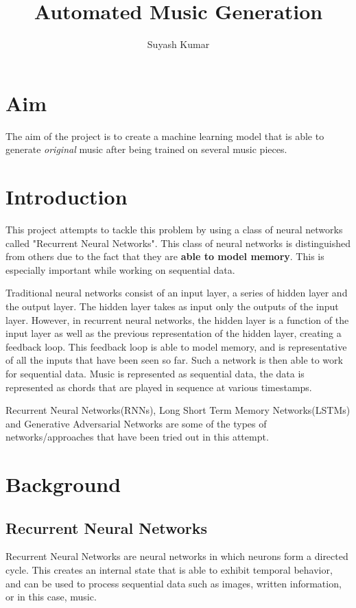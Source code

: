 \documentclass[11pt]{article}
\begin{document}
\title{Automated Music Generation}

\author{Suyash Kumar}

\maketitle

\section{Aim}
The aim of the project is to create a machine learning model that is able to generate {\em original} music after being trained on several music pieces.
\section{Introduction}
This project attempts to tackle this problem by using a class of neural networks called "Recurrent Neural Networks". This class of neural networks is distinguished from others due to the fact that they are {\bf able to model memory}. This is especially important while working on sequential data.

Traditional neural networks consist of an input layer, a series of hidden layer and the output layer. The hidden layer takes as input only the outputs of the input layer. However, in recurrent neural networks, the hidden layer is a function of the input layer as well as the previous representation of the hidden layer, creating a feedback loop. This feedback loop is able to model memory, and is representative of all the inputs that have been seen so far. Such a network is then able to work for sequential data. Music is represented as sequential data, the data is represented as chords that are played in sequence at various timestamps.

Recurrent Neural Networks(RNNs), Long Short Term Memory Networks(LSTMs) and Generative Adversarial Networks are some of the types of networks/approaches that have been tried out in this attempt.
\section{Background}
\subsection{Recurrent Neural Networks}
Recurrent Neural Networks are neural networks in which neurons form a directed cycle. This creates an internal state that is able to exhibit temporal behavior, and can be used to process sequential data such as images, written information, or in this case, music.
\end{document}
